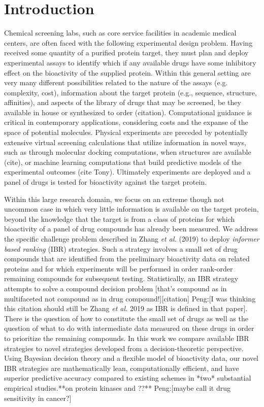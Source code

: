 \documentclass[12pt]{article}
\newcommand{\peng}[1]{{\color{blue} Peng:[{#1}]}}
\begin{document}
\doublespacing


\section{Introduction} \label{sec:introduction}

Chemical screening labs, such as core service facilities
in academic medical centers, are often faced with the following experimental design problem.  Having received some quantity of
a purified protein target, they must plan and deploy experimental
assays to identify which if any available drugs  have some inhibitory effect on the bioactivity of the supplied protein.  Within this 
general setting are very many different possibilities related to the
nature of the assays (e.g. complexity, cost), information
about the target protein (e.g., sequence, structure, affinities), and 
aspects of the library of drugs that may be screened, be they available
in house or synthesized to order (citation).  Computational guidance
is critical in contemporary applications, considering costs and the
expanse of the space of potential molecules. Physical experiments are preceded by potentially extensive virtual screening calculations that
utilize information in novel ways, such as through molecular docking computations, when structures are available (cite), or machine learning 
computations that build predictive models of the experimental outcomes (cite Tony).  Ultimately experiments are deployed and a panel of drugs is tested for bioactivity against the target protein.  

Within this large research domain, we focus on an extreme though not
uncommon case in which very little information is available on the target protein, beyond the knowledge that the target is
from a class of proteins for which 
bioactivity of a panel of drug 
compounds has already been measured.  
We address the specific challenge problem described 
in Zhang {\em et al.} (2019) to deploy {\em informer based ranking} (IBR)
strategies.  Such a strategy involves a small set of drug compounds
that are identified from the preliminary bioactivity data on related proteins
and for which experiments will be performed in order rank-order 
remaining compounds for subsequent testing.  Statistically, an IBR 
strategy 
attempts to solve a compound decision problem [that's compound as
in multifaceted not compound as in drug compound!][citation] \peng{I was thinking this citation should still be Zhang {\em et al.} 2019 as IBR is defined in that paper}. 
There is the question of how to constitute the small set 
of drugs as well as the question of what to do with intermediate data
measured on these drugs in order to prioritize the 
remaining compounds. In this work
we compare 
available IBR strategies to novel strategies developed from a decision-theoretic perspective.  Using Bayesian decision theory
and a flexible model of bioactivity data, our novel IBR strategies
are mathematically lean,  computationally efficient, and
have superior predictive accuracy compared to existing schemes in *two* substantial empirical studies.**on
protein kinases and ??** \peng{maybe call it drug sensitivity in cancer?}
\end{document}

